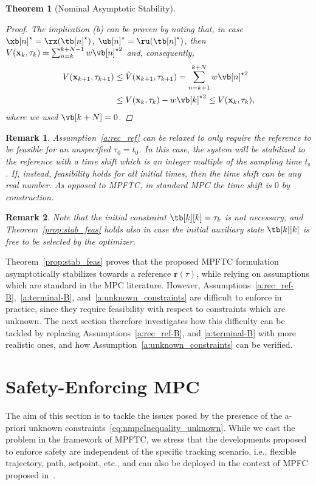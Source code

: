 \documentclass[journal]{IEEEtran}
\newcommand{\x}{{\mathbf{x}}}
\renewcommand{\r}{{\mathbf{r}}}
\newcommand{\review}[1]{#1}
\newtheorem{Theorem}{Theorem}
\newtheorem{Remark}{Remark}
\begin{document}
\begin{Theorem} [Nominal Asymptotic Stability]
\begin{proof}
			The implication (b) can be proven by noting that, in case $\xb[n]^\star=\rx(\tb[n]^\star)$, $\ub[n]^\star=\ru(\tb[n]^\star)$, then $V(\x_k,\tau_k)=\sum_{n=k}^{k+N-1} w\vb[n]^{\star{}2}$ and, consequently,
			\begin{align*}
			V(\x_{k+1},\tau_{k+1}) &\leq \tilde V(\x_{k+1},\tau_{k+1}) =\sum_{n=k+1}^{k+N} w\vb[n]^{\star{}2}  \\ &\leq{} V(\x_k,\tau_k) - w\vb[k]^{\star{}2} \leq V(\x_k,\tau_k),
			\end{align*}
			where we used $\vb[k+N]=0$. 
		\end{proof}
	\end{Theorem}
	\begin{Remark} 
		Assumption~\ref{a:rec_ref} can be relaxed to only require the reference to be feasible for an unspecified $\tau_0=t_0$. In this case, the system will be stabilized to the reference with a time shift which is an integer multiple of the sampling time $t_\mathrm{s}$. If, instead, feasibility holds for all initial times, then the time shift can be any real number. As opposed to MPFTC, in standard MPC the time shift is $0$ by construction.
	\end{Remark}
	\review{\begin{Remark}\label{remark:free_time}
			Note that the initial constraint $\tb[k][k]=\tau_k$ is not necessary, and Theorem~\ref{prop:stab_feas} holds also in case the initial auxiliary state $\tb[k][k]$ is free to be selected by the optimizer. 
	\end{Remark}}
	Theorem~\ref{prop:stab_feas} proves that the proposed MPFTC formulation asymptotically stabilizes towards a reference $\r(\tau)$, while relying on assumptions which are standard in the MPC literature. 
	However, Assumptions~\ref{a:rec_ref-B},~\ref{a:terminal-B}, and~\ref{a:unknown_constraints} are difficult to enforce in practice, since they require feasibility with respect to constraints which are unknown. The next section therefore investigates how this difficulty can be tackled by replacing Assumptions~\ref{a:rec_ref-B}, and \ref{a:terminal-B} with more realistic ones, and how Assumption~\ref{a:unknown_constraints} can be verified.
	
		
	\section{Safety-Enforcing MPC}\label{sec:safe_mpftc}
	The aim of this section is to tackle the issues posed by the presence of the a-priori unknown constraints~\eqref{eq:nmpcInequality_unknown}. While we cast the problem in the framework of MPFTC, we stress that the developments proposed to enforce safety are independent of the specific tracking scenario, i.e., flexible trajectory, path, setpoint, etc., and can also be deployed in the context of MPFC proposed in~\cite{Faulwasser2009,Faulwasser2016}.
	
\end{document}
